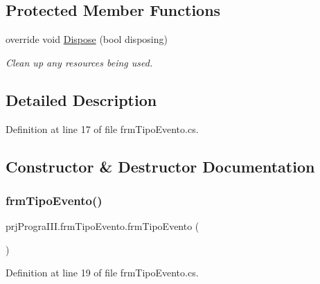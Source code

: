 \subsection*{Protected Member Functions}
\begin{DoxyCompactItemize}
\item 
override void \hyperlink{classprj_progra_i_i_i_1_1frm_tipo_evento_acb1b45357fdadc0bb443b87f79a31d57}{Dispose} (bool disposing)
\begin{DoxyCompactList}\small\item\em Clean up any resources being used. \end{DoxyCompactList}\end{DoxyCompactItemize}


\subsection{Detailed Description}


Definition at line 17 of file frm\+Tipo\+Evento.\+cs.



\subsection{Constructor \& Destructor Documentation}
\hypertarget{classprj_progra_i_i_i_1_1frm_tipo_evento_a0c0ddf17875c0f054d4c38bb6793605e}{}\label{classprj_progra_i_i_i_1_1frm_tipo_evento_a0c0ddf17875c0f054d4c38bb6793605e} 
\subsubsection{\texorpdfstring{frm\+Tipo\+Evento()}{frmTipoEvento()}}
{\footnotesize\ttfamily prj\+Progra\+I\+I\+I.\+frm\+Tipo\+Evento.\+frm\+Tipo\+Evento (\begin{DoxyParamCaption}{ }\end{DoxyParamCaption})}



Definition at line 19 of file frm\+Tipo\+Evento.\+cs.

